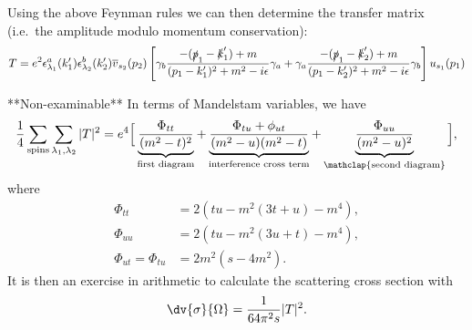 \documentclass{jknotes} %
\begin{document}
Using the above Feynman rules we can then determine the transfer matrix (i.e.\ the amplitude modulo momentum conservation):
\begin{equation}
    T = e^2\epsilon_{\lambda_1}^a(k_1')\epsilon_{\lambda_2}^b(k_2')\overline{v}_{s_2}(p_2)\left[\gamma_b\frac{-(\slashed{p}_1-\slashed{k}_1')+m}{(p_1-k_1')^2+m^2-i\epsilon}\gamma_a + \gamma_a\frac{-(\slashed{p}_1-\slashed{k}_2')+m}{(p_1-k_2')^2+m^2-i\epsilon}\gamma_b\right]u_{s_1}(p_1)
\end{equation}

**Non-examinable**
In terms of Mandelstam variables, we have
\begin{equation}
    \frac{1}{4} \sum_{\text{spins}} \sum_{\lambda_1,\lambda_2}|T|^2 = e^4\Big[\underbrace{\frac{\Phi_{tt}}{(m^2-t)^2}}_{\text{first diagram}} + \underbrace{\frac{\Phi_{tu}+\phi_{ut}}{(m^2-u)(m^2-t)}}_{\text{interference cross term}} + \underbrace{\frac{\Phi_{uu}}{(m^2-u)^2}}_{\mathclap{\text{second diagram}}}\Big],
\end{equation}
where
\begin{align}
    \Phi_{tt} &= 2(tu-m^2(3t+u)-m^4), \\
    \Phi_{uu} &= 2(tu-m^2(3u+t)-m^4), \\
    \Phi_{ut} = \Phi_{tu} &= 2m^2(s-4m^2).
\end{align}
It is then an exercise in arithmetic to calculate the scattering cross section with
\begin{equation}
    \dv{\sigma}{\Omega} = \frac{1}{64\pi^2 s}|T|^2.
\end{equation}
\end{document}
